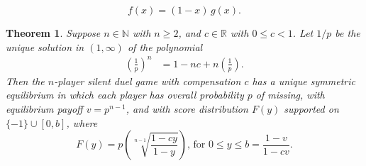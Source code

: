 \documentclass[11pt,a4paper]{article}%
\numberwithin{equation}{section}
\theoremstyle{plain}
\newtheorem{theorem}{Theorem}[section]
\begin{document}
\begin{equation}
\label{eq:fandg}
f(x) =(1 - x) \, g(x) \text{.}
\end{equation}
%
\begin{theorem}
\label{thm:sdsoln}
Suppose $n \in \mathbb{N}$ with $n \geqslant 2$, and $c \in \mathbb{R}$ with $0 \leqslant c < 1$. Let $1/p$ be the unique solution in $(1, \infty)$ of the polynomial
\begin{align*}
\left( \frac{1}{p} \right) ^{n} &= 1 - nc + n \left( \frac{1}{p} \right) \text{.}
\end{align*}%
Then the $n$-player silent duel game with compensation $c$ has a unique symmetric equilibrium in which each player has overall probability $p$ of missing, with equilibrium payoff $v = p^{n - 1}$, and with score distribution $F(y)$ supported on $\{ -1 \} \cup [0, b]$, where
\begin{equation}
\label{eq:F(y)}
F(y) = p \left( \sqrt[n-1]{\frac{1 - cy}{1 - y}} \right) \text{, for }%
0 \leqslant y \leqslant b = \frac{1 - v}{1 - cv} \text{.}
\end{equation}
\end{theorem}
%
\end{document}
